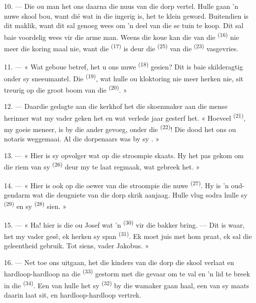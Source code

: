 \VUsaut{3.0mm}
\VUsaut{3.0mm}

10. --- Die ou man het ons daarna die nuus van die dorp vertel. Hulle gaan 'n nuwe skool
bou, want dié wat in die  ingerig is, het te klein geword.
Buitendien is dit maklik, want dit sal genoeg wees om 'n deel van die 
se tuin te koop. Dit sal baie voordelig wees vir die arme man. Weens die koue kan die
 van die  \textsuperscript{(16)} nie meer die koring maal
nie, want die  \textsuperscript{(17)} is deur die 
\textsuperscript{(25)} van die  \textsuperscript{(23)} vasgevries.

11. --- « Wat geboue betref, het u ons nuwe  \textsuperscript{(18)} gesien?
Dit is baie skilderagtig onder sy sneeumantel. Die  \textsuperscript{(19)},
wat hulle ou kloktoring nie meer herken nie, sit treurig op die groot boom van die
 \textsuperscript{(20)}. »

12. --- Daardie gedagte aan die kerkhof het die skoenmaker aan die mense herinner wat my
vader geken het en wat verlede jaar gesterf het. « Hoeveel 
\textsuperscript{(21)}, my goeie meneer, is by die ander gevoeg, onder die
 \textsuperscript{(22)}! Die dood het ons ou notaris weggemaai. Al die
dorpenaars was by sy . »

13. --- « Hier is sy opvolger wat op die stroompie skaats. Hy het pas gekom om die riem
van sy  \textsuperscript{(26)} deur my te laat regmaak, wat gebreek het. »

14. --- « Hier is ook op die oewer van die stroompie die nuwe 
\textsuperscript{(27)}. Hy is 'n oud-gendarm wat die deugniete van die dorp skrik aanjaag.
Hulle vlug sodra hulle sy  \textsuperscript{(29)} en sy 
\textsuperscript{(28)} sien. »

15. --- « Ha! hier is die ou Josef wat 'n 
\textsuperscript{(30)} vir die bakker bring. --- Dit is waar, het my vader gesê, ek
herken sy span  \textsuperscript{(31)}. Ek moet juis met hom praat, ek sal
die geleentheid gebruik. Tot siens, vader Jakobus. »

16. --- Net toe ons uitgaan, het die kinders van die dorp die skool verlaat en
hardloop-hardloop na die  \textsuperscript{(33)} gestorm met die gevaar
om te val
en 'n lid te breek in die  \textsuperscript{(34)}. Een van hulle het sy
 \textsuperscript{(32)} by die wamaker gaan haal, een van sy maats daarin
laat sit, en hardloop-hardloop vertrek.

